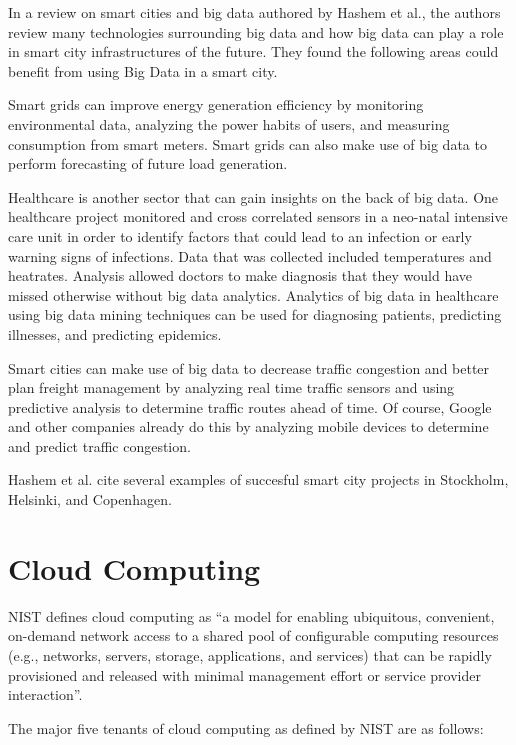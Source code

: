 \documentclass[]{article}
\begin{document}
In a review on smart cities and big data authored by Hashem et al.\cite{hashem_role_2016}, the authors review many technologies surrounding big data and how big data can play a role in smart city infrastructures of the future. They found the following areas could benefit from using Big Data in a smart city. 

Smart grids can improve energy generation efficiency by monitoring environmental data, analyzing the power habits of users, and measuring consumption from smart meters\cite{lai2015big}. Smart grids can also make use of big data to perform forecasting of future load generation\cite{al2015applications}. 

Healthcare is another sector that can gain insights on the back of big data. One healthcare project monitored and cross correlated sensors in a neo-natal intensive care unit in order to identify factors that could lead to an infection or early warning signs of infections. Data that was collected included temperatures and heatrates. Analysis allowed doctors to make diagnosis that they would have missed otherwise without big data analytics\cite{ibm_healthcare}.  Analytics of big data in healthcare using big data mining techniques can be used for diagnosing patients, predicting illnesses, and predicting epidemics\cite{roy2007middleware}.

Smart cities can make use of big data to decrease traffic congestion and better plan freight management by analyzing real time traffic sensors and using predictive analysis to determine traffic routes ahead of time\cite{ADMA}. Of course, Google and other companies already do this by analyzing mobile devices to determine and predict traffic congestion.

Hashem et al.\cite{hashem_role_2016} cite several examples of succesful smart city projects in Stockholm, Helsinki, and Copenhagen.


\section{Cloud Computing} \label{sec:cloud-computing}
NIST\cite{mell2011nist} defines cloud computing as ``a model for enabling ubiquitous, convenient, on-demand network access to a shared pool of configurable computing resources (e.g., networks, servers, storage, applications, and services) that can be rapidly provisioned and released with minimal management effort or service provider interaction''.

The major five tenants of cloud computing as defined by NIST are as follows: 
\end{document}
